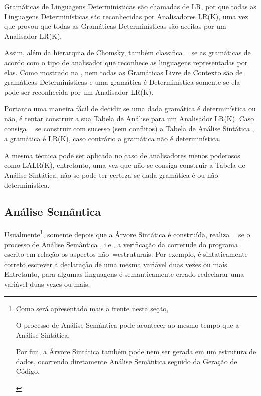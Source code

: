 Gramáticas de Linguagens Determinísticas são chamadas de LR,
por que todas as Linguagens Determinísticas são reconhecidas por Analisadores LR(K),
uma vez que  provou que todas as Gramáticas Determinísticas são aceitas por um Analisador LR(K).

Assim,
além da hierarquia de Chomsky,
também classifica~=se as gramáticas de acordo com o tipo de analisador que reconhece as linguagens representadas por elas.
Como mostrado na ,
nem todas as Gramáticas Livre de Contexto são de gramáticas Determinísticas e
uma gramática é Determinística somente se ela pode ser reconhecida por um Analisador LR(K).

Portanto uma maneira fácil de decidir se uma dada gramática é determinística ou
não,
é tentar construir a sua Tabela de Análise para um Analisador LR(K).
Caso consiga~=se construir com sucesso (sem conflitos) a Tabela de Análise Sintática \cite{ahoCompilerDragonBook},
a gramática é LR(K),
caso contrário a gramática não é determinística.

A mesma técnica pode ser aplicada no caso de analisadores menos poderosos como LALR(K),
entretanto,
uma vez que não se consiga construir a Tabela de Análise Sintática,
não se pode ter certeza se dada gramática é ou não determinística.


\subsection{Análise Semântica}
\label{analiseSemantica}

Usualmente\footnote{
Como será apresentado mais a frente nesta seção,
\begin{inparaenum}
\item O processo de Análise Semântica pode acontecer ao mesmo tempo que a Análise Sintática,
\item Por fim,
a Árvore Sintática também pode nem ser gerada em um estrutura de dados,
ocorrendo diretamente Análise Semântica seguido da Geração de Código.
\end{inparaenum}
},
somente depois que a Árvore Sintática é construída,
realiza~=se o processo de Análise Semântica \cite{ahoCompilerDragonBook},
i.e.,
a verificação da corretude do programa escrito em relação os aspectos não~=estruturais.
Por exemplo,
é sintaticamente correto escrever a declaração de uma mesma variável duas vezes ou
mais. Entretanto,
para algumas linguagens é semanticamente errado redeclarar uma variável duas vezes ou
mais.


